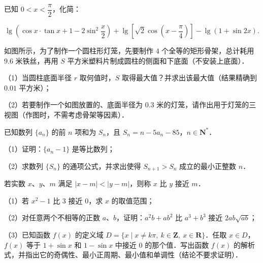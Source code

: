 \begingroup
\renewenvironment{question}{\Needspace{0.5\textheight}}{}
\begin{question}
已知 $0<x<\dfrac\pi2$，化简：

\nopagebreak[4]
\[\lg\left(\cos x\cdot\tan x+1-2\sin^2\frac x2\right)
+\lg\left[\sqrt2\cos\left(x-\frac\pi4\right)\right]
-\lg(1+\sin2x).\]

\Needspace{0.4\textheight}
\end{question}
\endgroup
\begin{question}
如图所示，为了制作一个圆柱形灯笼，先要制作 $4$ 个全等的矩形骨架，总计耗用 $9.6$ 米铁丝，再用 $S$ 平方米塑料片制成圆柱的侧面和下底面（不安装上底面）．

（1）当圆柱底面半径 $r$ 取何值时，$S$ 取得最大值？并求出该最大值（结果精确到 $0.01$ 平方米）；

（2）若要制作一个如图放置的、底面半径为 $0.3$ 米的灯笼，请作出用于灯笼的三视图（作图时，不需考虑骨架等因素）．
\nopagebreak[4]
\begin{center}\end{center}
\nopagebreak[4]
\end{question}
\begin{question}
已知数列 $\{a_n\}$ 的前 $n$ 项和为 $S_n$，且 $S_n=n-5a_n-85$，$n\in\mathbf N^*$．

（1）证明：$\{a_n-1\}$ 是等比数列；

（2）求数列 $\{S_n\}$ 的通项公式，并求出使得 $S_{n+1}>S_n$ 成立的最小正整数 $n$．

\end{question}
\begin{question}
若实数 $x$、$y$、$m$ 满足 $|x-m|<|y-m|$，则称 $x$ 比 $y$ 接近 $m$．

（1）若 $x^2-1$ 比 $3$ 接近 $0$，求 $x$ 的取值范围；

（2）对任意两个不相等的正数 $a$、$b$，证明：$a^2b+ab^2$ 比 $a^3+b^3$ 接近 $2ab\sqrt{ab}$；

（3）已知函数 $f(x)$ 的定义域 $D=\{x\mid x\neq k\pi,\ k\in\mathbf Z,\ x\in\mathbf R\}$．任取 $x\in D$，$f(x)$ 等于 $1+\sin x$ 和 $1-\sin x$ 中接近 $0$ 的那个值．写出函数 $f(x)$ 的解析式，并指出它的奇偶性、最小正周期、最小值和单调性（结论不要求证明）．

\end{question}
